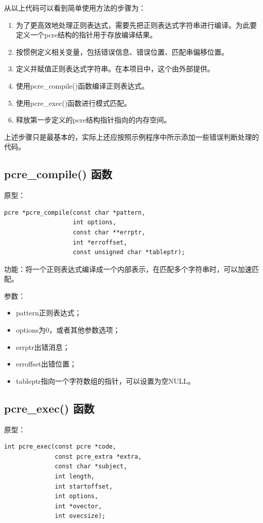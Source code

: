 从以上代码可以看到简单使用方法的步骤为：
\begin{enumerate}
\item 为了更高效地处理正则表达式，需要先把正则表达式字符串进行编译。为此要定义一个pcre结构的指针用于存放编译结果。
\item 按惯例定义相关变量，包括错误信息、错误位置、匹配串偏移位置。
\item 定义并赋值正则表达式字符串。在本项目中，这个由外部提供。
\item 使用pcre\_compile()函数编译正则表达式。
\item 使用pcre\_exec()函数进行模式匹配。
\item 释放第一步定义的pcre结构指针指向的内存空间。
\end{enumerate}

上述步骤只是最基本的，实际上还应按照示例程序中所示添加一些错误判断处理的代码。

\subsection{pcre\_compile() 函数}
原型：
\begin{verbatim}
pcre *pcre_compile(const char *pattern,
                   int options,
                   const char **errptr,
                   int *erroffset,
                   const unsigned char *tableptr);
\end{verbatim}

功能：将一个正则表达式编译成一个内部表示，在匹配多个字符串时，可以加速匹配。

参数：
\begin{itemize}
\item pattern正则表达式；
\item options为0，或者其他参数选项；
\item errptr出错消息；
\item erroffset出错位置；
\item tableptr指向一个字符数组的指针，可以设置为空NULL。
\end{itemize}


\subsection{pcre\_exec() 函数}
原型：
\begin{verbatim}
int pcre_exec(const pcre *code,
              const pcre_extra *extra,
              const char *subject,
              int length,
              int startoffset,
              int options,
              int *ovector,
              int ovecsize);
\end{verbatim}


